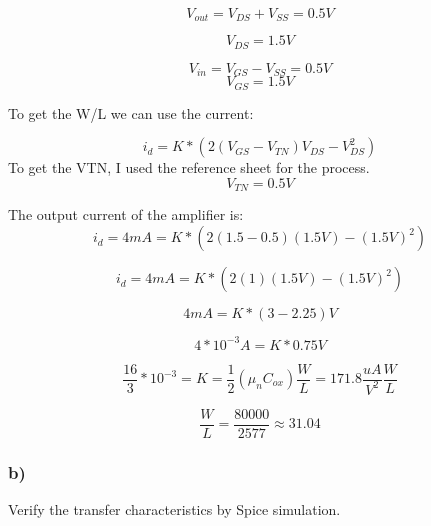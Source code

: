 \documentclass[10pt,a4paper]{article}
\begin{document}
\begin{equation}
V_{out} = V_{DS} + V_{SS}  = 0.5 V
\end{equation}

\begin{equation}
V_{DS} = 1.5 V
\end{equation}

\begin{equation}
V_{in} = V_{GS} - V_{SS} = 0.5 V
\end{equation}
\begin{equation}
V_{GS} = 1.5 V
\end{equation}

To get the W/L we can use the current:

\begin{equation}
i_{d} = K * (2(V_{GS} - V_{TN}) V_{DS} - V_{DS}^2)	
\end{equation}
To get the VTN, I used the reference sheet for the process. 
\begin{equation}
V_{TN} =  0.5V
\end{equation}


The output current of the amplifier is:
\begin{equation}
i_{d} = 4mA = K * (2(1.5 -0.5)(1.5V) - (1.5V)^2)
\end{equation}

\begin{equation}
i_{d} = 4mA = K * (2(1)(1.5V) - (1.5V)^2)
\end{equation}

\begin{equation}
4mA = K * (3 - 2.25)V
\end{equation}

\begin{equation}
4*10^{-3} A = K * 0.75V
\end{equation}

\begin{equation}
\frac{16}{3}*10^{-3} = K = \frac{1}{2}(\mu_n C_{ox})\frac{W}{L} = 171.8 \frac{uA}{V^2} \frac{W}{L}
\end{equation}

\begin{equation}
\frac{W}{L} = \frac{80000}{2577} \approx 31.04
\end{equation}



\subsubsection*{b)}
Verify the transfer characteristics by Spice simulation.
\end{document}

